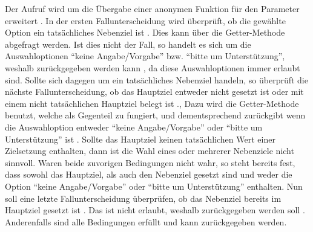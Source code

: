 Der Aufruf  wird um die Übergabe einer anonymen Funktion für den Parameter  erweitert .
In der ersten Fallunterscheidung wird überprüft,
ob die gewählte Option ein tatsächliches Nebenziel ist .
Dies kann über die Getter-Methode  abgefragt werden.
Ist dies nicht der Fall,
so handelt es sich um die Auswahloptionen \enquote{keine Angabe/Vorgabe} bzw. \enquote{bitte um Unterstützung},
weshalb  zurückgegeben werden kann ,
da diese Auswahloptionen immer erlaubt sind.
Sollte sich dagegen um ein tatsächliches Nebenziel handeln,
so überprüft die nächste Fallunterscheidung,
ob das Hauptziel entweder nicht gesetzt ist
oder mit einem nicht tatsächlichen Hauptziel belegt ist .,
Dazu wird die Getter-Methode  benutzt,
welche als Gegenteil zu  fungiert,
und dementsprechend  zurückgibt wenn die Auswahloption entweder \enquote{keine Angabe/Vorgabe} oder \enquote{bitte um Unterstützung} ist .
Sollte das Hauptziel keinen tatsächlichen Wert einer Zielsetzung enthalten,
dann ist die Wahl eines oder mehrerer Nebenziele nicht sinnvoll.
Waren beide zuvorigen Bedingungen nicht wahr,
so steht bereits fest,
dass sowohl das Hauptziel,
als auch den Nebenziel gesetzt sind
und weder die Option \enquote{keine Angabe/Vorgabe}
oder \enquote{bitte um Unterstützung} enthalten.
Nun soll eine letzte Fallunterscheidung überprüfen,
ob das Nebenziel bereits im Hauptziel gesetzt ist . 
Das ist nicht erlaubt,
weshalb  zurückgegeben werden soll .
Anderenfalls sind alle Bedingungen erfüllt und  kann zurückgegeben werden.

